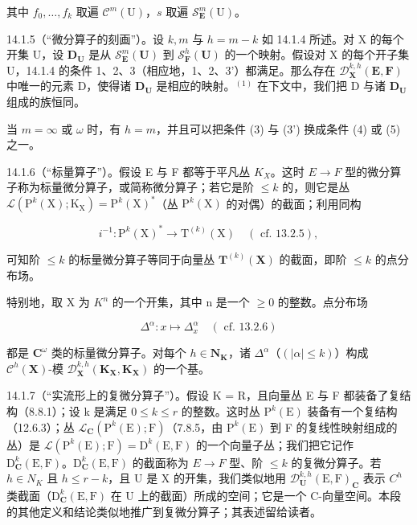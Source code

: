 其中 \(f_{0},\ldots,f_{k}\) 取遍 \(\mathcal{C}^{m}(\mathrm{U})\)，\(s\) 取遍 \(\mathcal{S}_{\mathbf{E}}^{m}(\mathrm{U})\)。

14.1.5（“微分算子的刻画”）。设 \(k, m\) 与 \(h = m - k\) 如 14.1.4 所述。对 X 的每个开集 U，设 \(\mathbf{D}_{\mathbf{U}}\) 是从 \(\mathcal{S}_{\mathbf{E}}^{m}(\mathbf{U})\) 到 \(\mathcal{S}_{\mathbf{F}}^{h}(\mathbf{U})\) 的一个映射。假设对 X 的每个开子集 U，14.1.4 的条件 1、2、3（相应地，1、2、3'）都满足。那么存在 \(\mathcal{D}_{\mathbf{X}}^{k,h}(\mathbf{E},\mathbf{F})\) 中唯一的元素 D，使得诸 \(\mathbf{D}_{\mathbf{U}}\) 是相应的映射。\(^{(1)}\) 在下文中，我们把 D 与诸 \(\mathbf{D}_{\mathbf{U}}\) 组成的族恒同。

当 \(m = \infty\) 或 \(\omega\) 时，有 \(h = m\)，并且可以把条件 (3) 与 (3') 换成条件 (4) 或 (5) 之一。

14.1.6（“标量算子”）。假设 E 与 F 都等于平凡丛 \(K_{X}\)。这时 \(E \rightarrow F\) 型的微分算子称为标量微分算子，或简称微分算子；若它是阶 \(\leqslant k\) 的，则它是丛 \(\mathcal{L}(\mathrm{P}^{k}(\mathrm{X}); \mathrm{K}_{\mathrm{X}}) = \mathrm{P}^{k}(\mathrm{X})^{*}\)（丛 \(\mathrm{P}^{k}(\mathrm{X})\) 的对偶）的截面；利用同构

\[
i ^ {- 1} \colon \mathrm{P} ^ {k} (\mathrm{X}) ^ {*} \rightarrow \mathrm{T} ^ {(k)} (\mathrm{X}) \quad (\text { cf. } 13.2.5),
\]

可知阶 \(\leqslant k\) 的标量微分算子等同于向量丛 \(\mathbf{T}^{(k)}(\mathbf{X})\) 的截面，即阶 \(\leqslant k\) 的点分布场。

特别地，取 X 为 \(K^{n}\) 的一个开集，其中 n 是一个 \(\geqslant0\) 的整数。点分布场

\[
\Delta^ {\alpha} \colon x \mapsto \Delta_ {x} ^ {\alpha} \quad (\text { cf. } 1 3. 2. 6)
\]

都是 \(\mathbf{C}^{\omega}\) 类的标量微分算子。对每个 \(h\in\mathbf{N}_{\mathbf{K}}\)，诸 \(\Delta^{\alpha}\)（\((|\alpha|\leqslant k)\)）构成 \(\mathcal{C}^{h}(\mathbf{X})\)-模 \(\mathcal{D}_{\mathbf{X}}^{k,h}(\mathbf{K}_{\mathbf{X}},\mathbf{K}_{\mathbf{X}})\) 的一个基。

14.1.7（“实流形上的复微分算子”）。假设 K = R，且向量丛 E 与 F 都装备了复结构（8.8.1）；设 k 是满足 \(0 \leqslant k \leqslant r\) 的整数。这时丛 \(\mathrm{P}^{k}(\mathrm{E})\) 装备有一个复结构（12.6.3）；丛 \(\mathcal{L}_{\mathbf{C}}(\mathrm{P}^{k}(\mathrm{E}); \mathrm{F})\)（7.8.5，由 \(\mathrm{P}^{k}(\mathrm{E})\) 到 F 的复线性映射组成的丛）是 \(\mathcal{L}(\mathrm{P}^{k}(\mathrm{E}); \mathrm{F}) = \mathrm{D}^{k}(\mathrm{E}, \mathrm{F})\) 的一个向量子丛；我们把它记作 \(\mathrm{D}_{\mathbf{C}}^{k}(\mathrm{E}, \mathrm{F})\)。\(\mathrm{D}_{\mathbf{C}}^{k}(\mathrm{E}, \mathrm{F})\) 的截面称为 \(E \to F\) 型、阶 \(\leqslant k\) 的复微分算子。若 \(h \in N_{K}\) 且 \(h \leqslant r - k\)，且 U 是 X 的开集，我们类似地用 \(\mathcal{D}_{\mathbf{U}}^{k,h}(\mathrm{E}, \mathrm{F})_{\mathbf{C}}\) 表示 \(C^{h}\) 类截面（\(\mathrm{D}_{\mathbf{C}}^{k}(\mathrm{E}, \mathrm{F})\) 在 U 上的截面）所成的空间；它是一个 C-向量空间。本段的其他定义和结论类似地推广到复微分算子；其表述留给读者。

